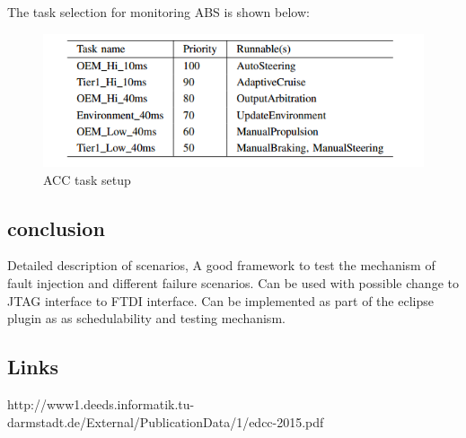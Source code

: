 \documentclass[12pt]{article} %
\begin{document}
The task selection for monitoring ABS is shown below:
\begin{figure}[H]
	\centering
	\includegraphics[width=400pt]{Pictures/Task}
	\caption{ACC task setup}\label{abs}
\end{figure}
\subsection{conclusion} %
Detailed description of scenarios, A good framework to test the mechanism of fault injection and different failure scenarios.
Can be used with possible change to JTAG interface to FTDI interface. Can be implemented as part of the eclipse plugin as as schedulability and testing mechanism.

\subsection{Links}
http://www1.deeds.informatik.tu-darmstadt.de/External/PublicationData/1/edcc-2015.pdf







\end{document}
